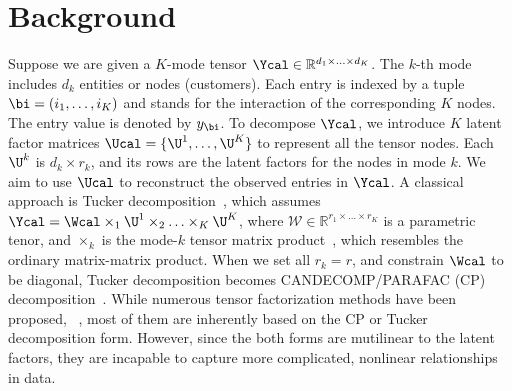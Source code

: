 \section{Background}
Suppose we are given a $K$-mode tensor $\Ycal \in \mathbb{R}^{d_1 \times \ldots \times d_K}$. The $k$-th mode includes $d_k$ entities or nodes (\eg customers).  Each entry is indexed by a tuple $\bi = (i_1, \ldots, i_K)$ and stands for the interaction of the corresponding $K$ nodes.  The entry value is denoted by $y_{\bi}$. To decompose $\Ycal$, we  introduce $K$ latent factor matrices $\Ucal = \{\U^1, \ldots, \U^K\}$ to represent all the tensor nodes. Each $\U^k$ is $d_k \times r_k$, and its rows are the latent factors for the nodes in mode $k$. We aim to use $\Ucal$ to reconstruct the observed entries in $\Ycal$. A classical approach is Tucker decomposition~\citep{Tucker66}, which assumes $\Ycal = \Wcal \times_1 \U^{1} \times_2 \ldots \times_K \U^{K}$, where  $\mathcal{W} \in \mathbb{R}^{r_1 \times \ldots \times r_K}$ is a parametric tenor,  and $\times_k$ is the mode-$k$ tensor matrix product~\citep{kolda2006multilinear}, which resembles the ordinary matrix-matrix product.
When we set all $r_k = r$, and constrain $\Wcal$ to be diagonal, Tucker decomposition becomes  CANDECOMP/PARAFAC (CP) decomposition~\citep{Harshman70parafac}. While numerous tensor factorization methods have  been proposed, \eg  ~\citep{Chu09ptucker,kang2012gigatensor,choi2014dfacto}, most of them are inherently  based on the CP or Tucker decomposition form. However, since the both forms are mutilinear to the latent factors, they are incapable to capture more complicated, nonlinear relationships in data.

